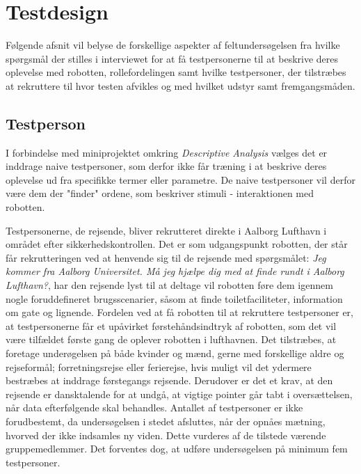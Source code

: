\section*{Testdesign}
\label{Testdesign}
%
Følgende afsnit vil belyse de forskellige aspekter af feltundersøgelsen fra hvilke spørgsmål der stilles i interviewet for at få testpersonerne til at beskrive deres oplevelse med robotten, rollefordelingen samt hvilke testpersoner, der tilstræbes at rekruttere til hvor testen afvikles og med hvilket udstyr samt fremgangsmåden.  

\subsection*{Testperson}
\label{Testpersoner}
%
I forbindelse med miniprojektet omkring \textit{Descriptive Analysis} vælges det er inddrage naive testpersoner, som derfor ikke får træning i at beskrive deres oplevelse ud fra specifikke termer eller parametre. De naive testpersoner vil derfor være dem der "finder" ordene, som beskriver stimuli - interaktionen med robotten.

Testpersonerne, de rejsende, bliver rekrutteret direkte i Aalborg Lufthavn i området efter sikkerhedskontrollen. Det er som udgangspunkt robotten, der står får rekrutteringen ved at henvende sig til de rejsende med spørgsmålet: \textit{Jeg kommer fra Aalborg Universitet. Må jeg hjælpe dig med at finde rundt i Aalborg Lufthavn?}, har den rejsende lyst til at deltage vil robotten føre dem igennem nogle foruddefineret brugsscenarier, såsom at finde toiletfaciliteter, information om gate og lignende. Fordelen ved at få robotten til at rekruttere testpersoner er, at testpersonerne får et upåvirket førstehåndsindtryk af robotten, som det vil være tilfældet første gang de oplever robotten i lufthavnen. \blankline 
%
Det tilstræbes, at foretage underøgelsen på både kvinder og mænd, gerne med forskellige aldre og rejseformål; forretningsrejse eller ferierejse, hvis muligt vil det ydermere bestræbes at inddrage førstegangs rejsende. Derudover er det et krav, at den rejsende er dansktalende for at undgå, at vigtige pointer går tabt i oversættelsen, når data efterfølgende skal behandles. Antallet af testpersoner er ikke forudbestemt, da undersøgelsen i stedet afsluttes, når der opnåes mætning, hvorved der ikke indsamles ny viden. Dette vurderes af de tilstede værende gruppemedlemmer. Det forventes dog, at udføre undersøgelsen på minimum fem testpersoner.


